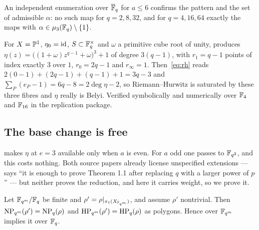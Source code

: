An independent enumeration over $\overline{\mathbb{F}}_q$ for $a \le 6$ confirms the pattern
and the set of admissible $\alpha$: no such map for $q = 2, 8, 32$, and for
$q = 4, 16, 64$ exactly the maps with $\alpha \in \mu_3(\mathbb{F}_q)\setminus\{1\}$.

\begin{remark}
\label{rem:explicit}
For $X = \mathbb{P}^1$, $\eta_0 = \mathrm{id}$, $S \subset \mathbb{F}_q^\times$ and $\omega$ a
primitive cube root of unity,  produces $\eta(z) =
\bigl((1+\omega)z^{q-1}+\omega\bigr)^3 + 1$ of degree $3(q-1)$, with
$r_1 = q-1$ points of index exactly $3$ over $1$, $r_0 = 2q-1$ and
$r_\infty = 1$. Then~\eqref{eq:rh} reads $2(0-1)+(2q-1)+(q-1)+1 = 3q-3$ and
$\sum_P(e_P-1) = 6q-8 = 2\deg\eta - 2$, so Riemann--Hurwitz is saturated by
these three fibres and $\eta$ really is Belyi. Verified symbolically and
numerically over $\mathbb{F}_4$ and $\mathbb{F}_{16}$ in the replication package.
\end{remark}

\subsection{The base change is free}
\label{sec:base-change}

 makes $\eta$ at $e = 3$ available only when $a$ is
even. For $a$ odd one passes to $\mathbb{F}_{q^2}$, and this costs nothing. Both
source papers already license unspecified extensions ---
\cite[\S2.1]{kramermiller2020abelian} says ``it is enough to prove
Theorem 1.1 after replacing $q$ with a larger power of $p$'' --- but neither
proves the reduction, and here it carries weight, so we prove it.

\begin{proposition}
\label{prop:base-change}
Let $\mathbb{F}_{q^m}/\mathbb{F}_q$ be finite and $\rho' = \rho|_{\pi_1(X_{\mathbb{F}_{q^m}})}$, and
assume $\rho'$ nontrivial. Then $\operatorname{NP}_{q^m}(\rho') = \operatorname{NP}_q(\rho)$ and
$\operatorname{HP}_{q^m}(\rho') = \operatorname{HP}_q(\rho)$ as polygons. Hence  over
$\mathbb{F}_{q^m}$ implies it over $\mathbb{F}_q$.
\end{proposition}

